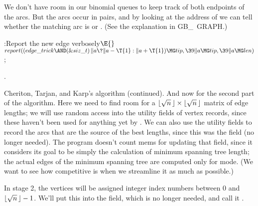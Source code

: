 We don't have room in our binomial queues to keep track of both
endpoints of the arcs. But the arcs occur in pairs, and by looking
at the address of  we can tell whether the matching arc is
 or . (See the explanation in {\sc GB\_%
\,GRAPH}.)

\Y\B\4:Report the new edge verbosely\X${}\E{}$\6
$\\{report}((\\{edge\_trick}\AND(\&{siz\_t})\,\|a\?\|a-\T{1}:\|a+\T{1})\MG%
\\{tip},\39\|a\MG\\{tip},\39\|a\MG\\{len}){}$;\par
{}.\fi

Cheriton, Tarjan, and Karp's algorithm (continued).
And now for the second part of the algorithm. Here we need to
find room for a $\hbox{$\lfloor\sqrt n\,\rfloor$}\times\hbox{$\lfloor\sqrt n\,\rfloor$}$ matrix of edge lengths;
we will use random access into the  utility fields of vertex records,
since these haven't been used for anything yet by .
We can also use the  utility fields to record the arcs that
are the source of the best lengths, since this was the 
field (no longer needed). The program doesn't count mems for
updating that field, since it considers its goal to be simply
the calculation of minimum spanning tree length; the actual
edges of the minimum spanning tree are computed only for
 mode. (We want to see how competitive 
is
when we streamline it as much as possible.)

In stage 2, the vertices will be assigned integer index numbers
between 0 and $\hbox{$\lfloor\sqrt n\,\rfloor$}-1$. We'll put this into the  field,
which is no longer needed, and call it .

